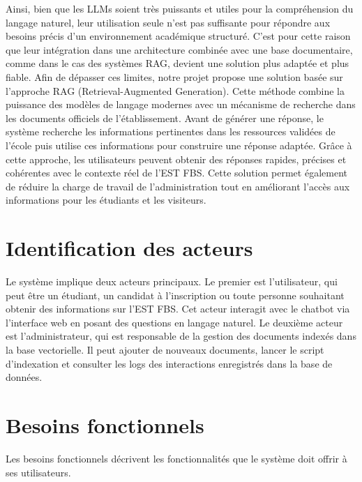 \documentclass[12pt,a4paper]{report}
\begin{document}
Ainsi, bien que les LLMs soient très puissants et utiles pour la compréhension du \newline  langage naturel, leur utilisation seule n’est pas suffisante pour répondre aux besoins précis d’un environnement académique structuré. C’est pour cette raison que leur intégration dans une architecture combinée avec une base documentaire, comme dans le cas des \newline systèmes RAG, devient une solution plus adaptée et plus fiable.
\newpage
Afin de dépasser ces limites, notre projet propose une solution basée sur l’approche RAG (Retrieval-Augmented Generation). Cette méthode combine la puissance des \newline modèles de langage modernes avec un mécanisme de recherche dans les documents \newline officiels de l’établissement. Avant de générer une réponse, le système recherche les \newline informations pertinentes dans les ressources validées de l’école puis utilise ces \newline informations pour construire une réponse adaptée. Grâce à cette approche, les utilisateurs peuvent obtenir des réponses rapides, précises et cohérentes avec le contexte réel de l’EST FBS. Cette solution permet également de réduire la charge de travail de \newline l’administration tout en améliorant l’accès aux informations pour \newline les étudiants et les visiteurs.
\newline

\section{Identification des acteurs}
Le système implique deux acteurs principaux. Le premier est l'utilisateur, qui peut être un étudiant, un candidat à l'inscription ou toute personne souhaitant obtenir des informations sur l'EST FBS. Cet acteur interagit avec le chatbot via l'interface web en posant des questions en langage naturel. Le deuxième acteur est l'administrateur, qui est responsable de la gestion des documents indexés dans la base vectorielle. Il peut ajouter de nouveaux documents, lancer le script d'indexation et consulter les logs des interactions enregistrés dans la base de données. \newpage
\section{Besoins fonctionnels}
Les besoins fonctionnels décrivent les fonctionnalités que le système doit offrir à ses utilisateurs.
\end{document}
